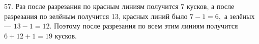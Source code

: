 57. Раз после разрезания по красным линиям получится 7 кусков, а после разрезания по зелёным получится 13, красных линий было $7-1=6,$ а зелёных --- $13-1=12.$ Поэтому после разрезания по всем этим линиям получится $6+12+1=19$ кусков.\\
